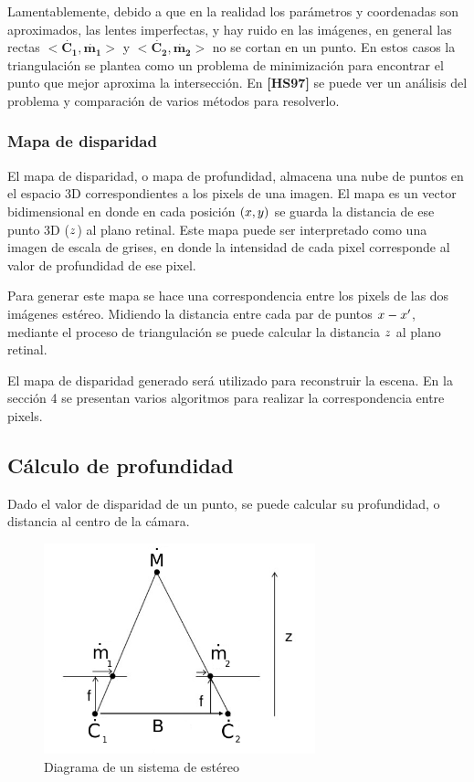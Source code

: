 \documentclass[11pt,a4paper,titlepage]{article}
\newcommand{\Cite}[1]{\textbf{[#1]}}
\newcommand{\Scalar}[1]{\ensuremath{\mathnormal{#1}}}
\newcommand{\TwoCart}[1]{\ensuremath{\mathbf{\dot{#1}}}}
\newcommand{\ThreeCart}[1]{\ensuremath{\mathbf{\dot{#1}}}}
\begin{document}
Lamentablemente, debido a que en la realidad los parámetros y coordenadas son aproximados, las lentes imperfectas, y hay ruido en las imágenes, en general las rectas $<\ThreeCart{C_1}, \TwoCart{m_1}>$ y $<\ThreeCart{C_2}, \TwoCart{m_2}>$ no se cortan en un punto. En estos casos la triangulación se plantea como un problema de minimización para encontrar el punto que mejor aproxima la intersección. En \Cite{HS97} se puede ver un análisis del problema y comparación de varios métodos para resolverlo.

\subsubsection{Mapa de disparidad}

El mapa de disparidad, o mapa de profundidad, almacena una nube de puntos en el espacio 3D correspondientes a los pixels de una imagen. El mapa es un vector bidimensional en donde en cada posición $(\Scalar{x}, \Scalar{y})$ se guarda la distancia de ese punto 3D (\Scalar{z}) al plano retinal. Este mapa puede ser interpretado como una imagen de escala de grises, en donde la intensidad de cada pixel corresponde al valor de profundidad de ese pixel.

Para generar este mapa se hace una correspondencia entre los pixels de las dos imágenes estéreo. Midiendo la distancia entre cada par de puntos $\Scalar{x} - \Scalar{x'}$, mediante el proceso de triangulación se puede calcular la distancia \Scalar{z} al plano retinal.

El mapa de disparidad generado será utilizado para reconstruir la escena. En la sección 4 se presentan varios algoritmos para realizar la correspondencia entre pixels.

\subsection{Cálculo de profundidad}

Dado el valor de disparidad de un punto, se puede calcular su profundidad, o distancia al centro de la cámara.

\begin{figure}[h!]
  \centering
    \includegraphics[width=0.7\textwidth]{fnew.png}
  \caption{Diagrama de un sistema de estéreo}
\end{figure}
\end{document}
